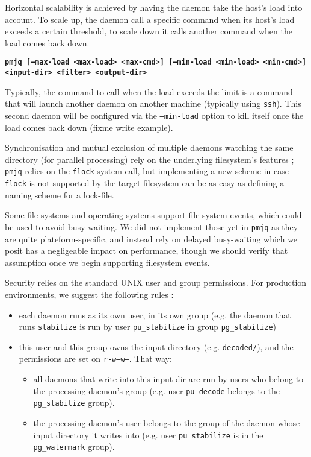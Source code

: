 \documentclass[letterpaper,twocolumn,10pt]{article}
\begin{document}
Horizontal scalability is achieved by having the daemon take the host's load into account. To scale up, the daemon call a specific command when its host's load exceeds a certain threshold, to scale down it calls another command when the load comes back down.

   {\bf \tt pmjq [--max-load <max-load> <max-cmd>] [--min-load <min-load> <min-cmd>] <input-dir> <filter> <output-dir> \\}

Typically, the command to call when the load exceeds the limit is a command that will launch another daemon on another machine (typically using {\tt ssh}). This second daemon will be configured via the {\tt --min-load} option to kill itself once the load comes back down (fixme write example).

Synchronisation and mutual exclusion of multiple daemons watching the same directory (for parallel processing) rely on the underlying filesystem's features ; {\tt pmjq} relies on the {\tt flock} system call, but implementing a new scheme in case {\tt flock} is not supported by the target filesystem can be as easy as defining a naming scheme for a lock-file.

Some file systems and operating systems support file system events, which could be used to avoid busy-waiting. We did not implement those yet in {\tt pmjq} as they are quite plateform-specific, and instead rely on delayed busy-waiting which we posit has a negligeable impact on performance, though we should verify that assumption once we begin supporting filesystem events.

Security relies on the standard UNIX user and group permissions. For production environments, we suggest the following rules :
\begin{itemize}
\item each daemon runs as its own user, in its own group (e.g. the daemon that runs {\tt stabilize} is run by user {\tt pu\_stabilize} in group {\tt pg\_stabilize})
\item this user and this group owns the input directory (e.g. {\tt decoded/}), and the permissions are set on {\tt r-w--w---}. That way:
  \begin{itemize}
  \item all daemons that write into this input dir are run by users who belong to the processing daemon's group (e.g. user {\tt pu\_decode} belongs to the {\tt pg\_stabilize} group).
  \item the processing daemon's user belongs to the group of the daemon whose input directory it writes into (e.g. user {\tt pu\_stabilize} is in the {\tt pg\_watermark} group).
  \end{itemize}
\end{itemize}
\end{document}
